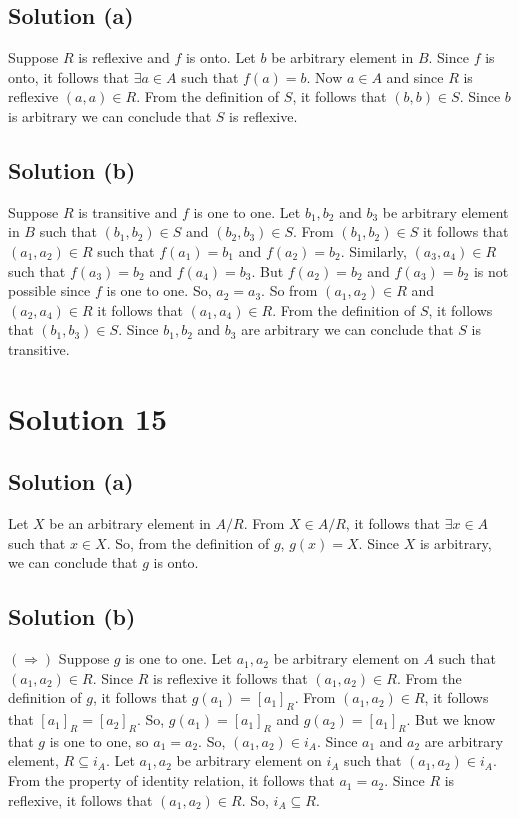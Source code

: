 \documentclass{article}
\begin{document}
\subsection{Solution (a)}
Suppose $R$ is reflexive and $f$ is onto. Let $b$ be arbitrary element
in $B$. Since $f$ is onto, it follows that $\exists a \in A$ such that
$f(a) = b$. Now $a \in A$ and since $R$ is reflexive $(a,a) \in R$.
From the definition of $S$, it follows that $(b,b) \in S$. Since $b$
is arbitrary we can conclude that $S$ is reflexive.

\subsection{Solution (b)}
Suppose $R$ is transitive and $f$ is one to one. Let $b_1, b_2$ and
$b_3$ be arbitrary element in $B$ such that $(b_1, b_2) \in S$ and
$(b_2, b_3) \in S$. From $(b_1, b_2) \in S$ it follows that $(a_1,
a_2) \in R$ such that $f(a_1) = b_1$ and $f(a_2) = b_2$. Similarly,
$(a_3,a_4) \in R$ such that $f(a_3) = b_2$ and $f(a_4) = b_3$. But
$f(a_2) = b_2$ and $f(a_3) = b_2$ is not possible since $f$ is one to
one. So, $a_2 = a_3$. So from $(a_1, a_2) \in R$ and $(a_2, a_4) \in
R$ it follows that $(a_1, a_4) \in R$. From the definition of $S$, it
follows that $(b_1, b_3) \in S$. Since $b_1, b_2$ and $b_3$ are
arbitrary we can conclude that $S$ is transitive.

\section{Solution 15}
\subsection{Solution (a)}Let $X$ be an arbitrary element in $A/R$.
From $X \in A / R$, it follows that $\exists x \in A$ such that $x \in
X$. So, from the definition of $g$, $g(x) = X$. Since $X$ is
arbitrary, we can conclude that $g$ is onto.

\subsection{Solution (b)}
$(\Rightarrow)$ Suppose $g$ is one to one. Let $a_1, a_2$ be arbitrary
element on $A$ such that $(a_1, a_2) \in R$. Since $R$ is reflexive it
follows that $(a_1, a_2) \in R$. From the definition of $g$, it
follows that $g(a_1) = [a_1]_R$. From $(a_1, a_2) \in R$, it follows
that $[a_1]_R = [a_2]_R$. So, $g(a_1) = [a_1]_R$ and $g(a_2) =
[a_1]_R$. But we know that $g$ is one to one, so $a_1 = a_2$. So,
$(a_1, a_2) \in i_A$. Since $a_1$ and $a_2$ are arbitrary element, $R
\subseteq i_A$. Let $a_1, a_2$ be arbitrary element on $i_A$ such that
$(a_1, a_2) \in i_A$. From the property of identity relation, it
follows that $a_1 = a_2$. Since $R$ is reflexive, it follows that
$(a_1, a_2) \in R$. So, $i_A \subseteq R$.
\end{document}
